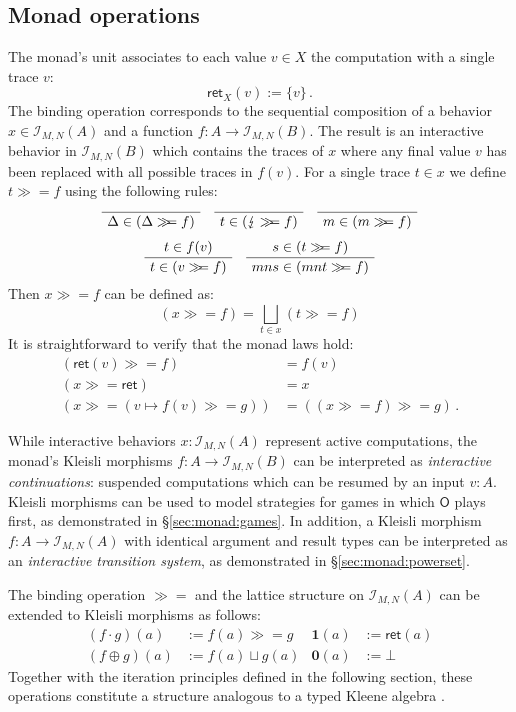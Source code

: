 \documentclass[acmsmall,timestamp,review]{acmart}
\newcommand{\kw}[1]{\ensuremath{ \mathsf{#1} }}
\newcommand{\bind}{\gg\!\!=}
\begin{document}

\subsection{Monad operations} %

The monad's unit associates to each value $v \in X$
the computation with a single trace $v$:
\[
    \kw{ret}_X(v) := \{ v \} \,.
\]
The binding operation corresponds to
the sequential composition of
a behavior $x \in \mathcal{I}_{M,N}(A)$ and
a function $f : A \rightarrow \mathcal{I}_{M,N}(B)$.
The result is an interactive behavior in $\mathcal{I}_{M,N}(B)$ which
contains the traces of $x$ where
any final value $v$ has been replaced with
all possible traces in $f(v)$.
For a single trace $t \in x$ we define $t \bind f$
using the following rules:
\begin{gather*}
  \AxiomC{}
  \UnaryInfC{$\Delta \in (\Delta \bind f)$}
  \DisplayProof
  \quad
  \AxiomC{}
  \UnaryInfC{$t \in (\lightning \bind f)$}
  \DisplayProof
  \quad
  \AxiomC{}
  \UnaryInfC{$m \in (m \bind f)$}
  \DisplayProof
  \\[1ex]
  \AxiomC{$t \in f(v)$}
  \UnaryInfC{$t \in (v \bind f)$}
  \DisplayProof
  \quad
  \AxiomC{$s \in (t \bind f)$}
  \UnaryInfC{$mns \in (mnt \bind f)$}
  \DisplayProof
\end{gather*}
Then $x \bind f$ can be defined as:
\[
    (x \bind f) = \bigsqcup_{t \in x} (t \bind f)
\]
It is straightforward to verify that
the monad laws hold:
\begin{align*}
  (\kw{ret}(v) \bind f) &= f(v) \\
  (x \bind \kw{ret}) &= x \\
  (x \bind (v \mapsto f(v) \bind g)) &= ((x \bind f) \bind g) \,.
\end{align*}

While interactive behaviors $x : \mathcal{I}_{M,N}(A)$
represent active computations,
the monad's Kleisli morphisms $f : A \rightarrow \mathcal{I}_{M,N}(B)$
can be interpreted as \emph{interactive continuations}:
suspended computations which can be resumed by an input $v : A$.
Kleisli morphisms can be used to
model strategies for games in which $\kw{O}$ plays first,
as demonstrated in \S\ref{sec:monad:games}.
In addition,
a Kleisli morphism
$f : A \rightarrow \mathcal{I}_{M,N}(A)$
with identical argument and result types
can be interpreted as an \emph{interactive transition system},
as demonstrated in \S\ref{sec:monad:powerset}.

The binding operation $\bind$
and the lattice structure on $\mathcal{I}_{M,N}(A)$
can be extended to Kleisli morphisms as follows:
\begin{align*}
    (f \cdot g)(a) &:= f(a) \bind g &
    \mathbf{1}(a) &:= \kw{ret}(a) \\
    (f \oplus g)(a) &:= f(a) \sqcup g(a) &
    \mathbf{0}(a) &:= \bot
\end{align*}
Together with the iteration principles
defined in the following section,
these operations constitute a structure
analogous to a typed Kleene algebra \cite{tka}.
\end{document}
